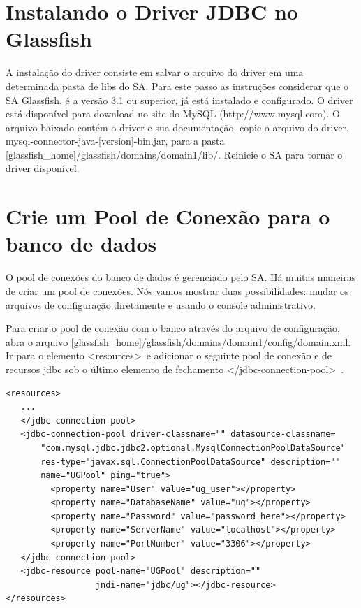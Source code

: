 \documentclass[envcountsame,envcountchap]{svmono}
\begin{document}
\section{Instalando o Driver JDBC no Glassfish}

A instalação do driver consiste em salvar o arquivo do driver em uma determinada pasta de libs do SA. Para este passo as instruções considerar que o SA Glassfish, é a versão 3.1 ou superior, já está instalado e configurado. O driver está disponível para download no site do MySQL (http://www.mysql.com). O arquivo baixado contém o driver e sua documentação. copie o arquivo do driver, mysql-connector-java-[version]-bin.jar, para a pasta [glassfish\_home]/glassfish/domains/domain1/lib/. Reinicie o SA para tornar o driver disponível.

\section{Crie um Pool de Conexão para o banco de dados}
\label{sec:creating-database-connection-pool}

O pool de conexões do banco de dados é gerenciado pelo SA. Há muitas maneiras de criar um pool de conexões. Nós vamos mostrar duas possibilidades: mudar os arquivos de configuração diretamente e usando o console administrativo.

Para criar o pool de conexão com o banco através do arquivo de configuração, abra o arquivo [glassfish\_home]/glassfish/domains/domain1/config/domain.xml. Ir para o elemento \textless resources\textgreater \ e adicionar o seguinte pool de conexão e de recursos jdbc sob o último elemento de fechamento \textless /jdbc-connection-pool\textgreater \ .

\begin{verbatim}
<resources>
   ...
   </jdbc-connection-pool>
   <jdbc-connection-pool driver-classname="" datasource-classname=
       "com.mysql.jdbc.jdbc2.optional.MysqlConnectionPoolDataSource"
       res-type="javax.sql.ConnectionPoolDataSource" description="" 
       name="UGPool" ping="true">
         <property name="User" value="ug_user"></property>
         <property name="DatabaseName" value="ug"></property>
         <property name="Password" value="password_here"></property>
         <property name="ServerName" value="localhost"></property>
         <property name="PortNumber" value="3306"></property>
   </jdbc-connection-pool>
   <jdbc-resource pool-name="UGPool" description="" 
                  jndi-name="jdbc/ug"></jdbc-resource>
</resources>
\end{verbatim}
\end{document}
